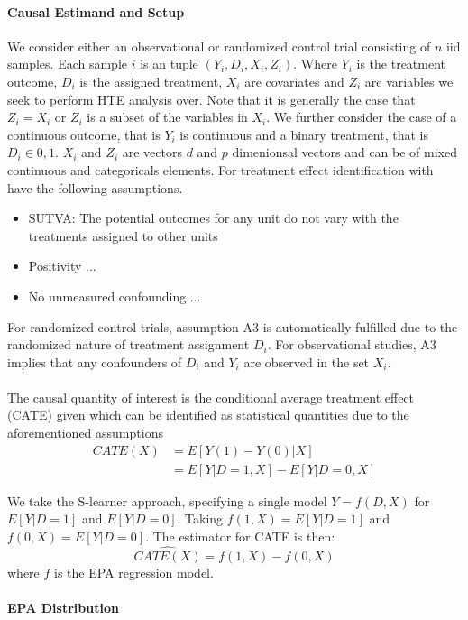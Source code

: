 \documentclass{article}
\begin{document}
\paragraph{Causal Estimand and Setup} We consider either an observational or randomized control trial consisting of $n$ iid samples. Each sample $i$ is an tuple $(Y_i, D_i, X_i, Z_i)$. Where $Y_i$ is the treatment outcome, $D_i$ is the assigned treatment, $X_i$ are covariates and $Z_i$ are variables we seek to perform HTE analysis over. Note that it is generally the case that $Z_i = X_i$ or $Z_i$ is a subset of the variables in $X_i$. We further consider the case of a continuous outcome, that is $Y_i$ is continuous and a binary treatment, that is $D_i \in {0,1}$. $X_i$ and $Z_i$ are vectors $d$ and $p$ dimenionsal vectors and can be of mixed continuous and categoricals elements. For treatment effect identification with have the following assumptions.
\begin{itemize}
    \item SUTVA: The potential outcomes for any unit do not vary with the treatments assigned to other units
    \item Positivity ... 
    \item No unmeasured confounding ...
\end{itemize}
For randomized control trials, assumption A3 is automatically fulfilled due to the randomized nature of treatment assignment $D_i$. For observational studies, A3 implies that any confounders of $D_i$ and $Y_i$ are observed in the set $X_i$. 
\\ \\
The causal quantity of interest is the conditional average treatment effect (CATE) given which can be identified as statistical quantities due to the aforementioned assumptions
\begin{align}
    CATE(X) &= E[Y(1)-Y(0)|X] \\
    &= E[Y|D=1,X] - E[Y|D=0,X]
\end{align}

We take the S-learner approach, specifying a single model $Y=f(D,X)$ for $E[Y|D=1]$ and $E[Y|D=0]$. Taking $f(1,X) = E[Y|D=1]$ and $f(0,X) = E[Y|D=0]$. The estimator for CATE is then:
$$\widehat{CATE(X)} = f(1,X) - f(0,X)$$ 
where $f$ is the EPA regression model.

\paragraph{EPA Distribution}
\end{document}
